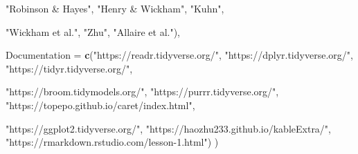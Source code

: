 \documentclass[10pt,letterpaper]{article}
\newenvironment{Shaded}{\begin{snugshade}}{\end{snugshade}}
\newcommand{\DataTypeTok}[1]{\textcolor[rgb]{0.13,0.29,0.53}{#1}}
\newcommand{\KeywordTok}[1]{\textcolor[rgb]{0.13,0.29,0.53}{\textbf{#1}}}
\newcommand{\NormalTok}[1]{#1}
\newcommand{\StringTok}[1]{\textcolor[rgb]{0.31,0.60,0.02}{#1}}
\begin{document}
\begin{Shaded}
\begin{Highlighting}[]
             \StringTok{"Robinson & Hayes"}\NormalTok{,}
             \StringTok{"Henry & Wickham"}\NormalTok{,}
             \StringTok{"Kuhn"}\NormalTok{, }
                    
             \StringTok{"Wickham et al."}\NormalTok{,}
             \StringTok{"Zhu"}\NormalTok{, }
             \StringTok{"Allaire et al."}\NormalTok{),}
  
  \DataTypeTok{Documentation =} \KeywordTok{c}\NormalTok{(}\StringTok{"https://readr.tidyverse.org/"}\NormalTok{, }
                    \StringTok{"https://dplyr.tidyverse.org/"}\NormalTok{, }
                    \StringTok{"https://tidyr.tidyverse.org/"}\NormalTok{,}
  
                    \StringTok{"https://broom.tidymodels.org/"}\NormalTok{,}
                    \StringTok{"https://purrr.tidyverse.org/"}\NormalTok{,}
                    \StringTok{"https://topepo.github.io/caret/index.html"}\NormalTok{, }
                    
                    \StringTok{"https://ggplot2.tidyverse.org/"}\NormalTok{,}
                    \StringTok{"https://haozhu233.github.io/kableExtra/"}\NormalTok{, }
                    \StringTok{"https://rmarkdown.rstudio.com/lesson-1.html"}\NormalTok{)}
\NormalTok{)}
\end{Highlighting}
\end{Shaded}
\end{document}
